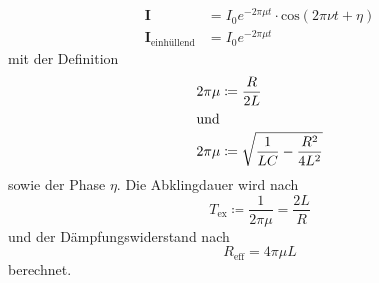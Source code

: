 \begin{align}
  \symbf{I} &= I_0 e^{-2\pi\mu t}
  \cdot\text{cos}\left(2\pi\nu t+\eta\right)\\
  \symbf{I}_\text{einhüllend} &= I_0 e^{-2\pi\mu t}
  \label{eqn:einhuellend}
\end{align}
mit der Definition
\begin{align}
  2\pi\mu&\coloneq\frac{R}{2L}\\
  \intertext{und}
  2\pi\mu&\coloneq\sqrt{\frac{1}{LC}-\frac{R^2}{4L^2}}
\end{align}
sowie der Phase $\eta$.
Die Abklingdauer wird nach
\begin{equation}
  T_{\text{ex}}\coloneq\frac{1}{2\pi\mu} = \frac{2L}{R}
  \label{tex}
\end{equation}
und der Dämpfungswiderstand nach
\begin{equation}
  R_{\text{eff}}= 4\pi\mu L
  \label{reff}
\end{equation}
berechnet.

